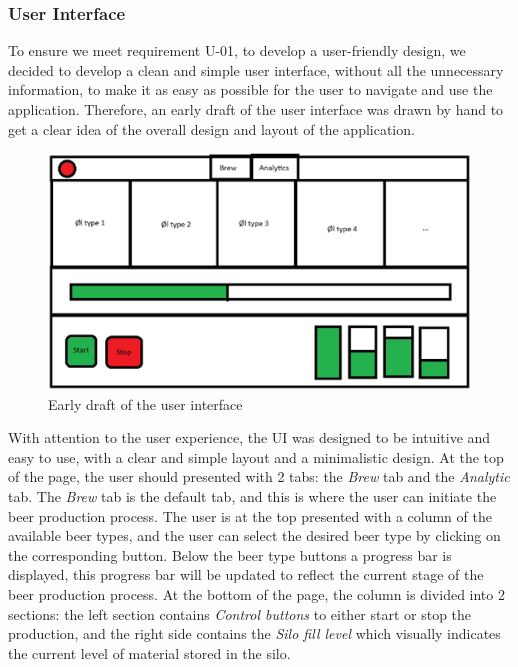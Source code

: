 \subsubsection{User Interface}
To ensure we meet requirement U-01, to develop a user-friendly design, we decided to develop a clean and simple user interface, without all the unnecessary information, to make it as easy as possible for the user to navigate and use the application. \newline
Therefore, an early draft of the user interface was drawn by hand to get a clear idea of the overall design and layout of the application. \newline
\begin{center}
  \centering
  \begin{figure}[H]
    \includegraphics[width=1\textwidth]{img/frontend-draft.png}
    \caption{Early draft of the user interface}
    \label{fig:Frontend_draft}
  \end{figure}
\end{center}

With attention to the user experience, the UI was designed to be intuitive and easy to use, with a clear and simple layout and a minimalistic design. At the top of the page, the user should presented with 2 tabs: the \textit{Brew} tab and the \textit{Analytic} tab.  \newline
The \textit{Brew} tab is the default tab, and this is where the user can initiate the beer production process. The user is at the top presented with a column of the available beer types, and the user can select the desired beer type by clicking on the corresponding button. \newline
Below the beer type buttons a progress bar is displayed, this progress bar will be updated to reflect the current stage of the beer production process. At the bottom of the page, the column is divided into 2 sections: the left section contains \textit{Control buttons} to either start or stop the production, and the right side contains the \textit{Silo fill level} which visually indicates the current level of material stored in the silo. \newline

